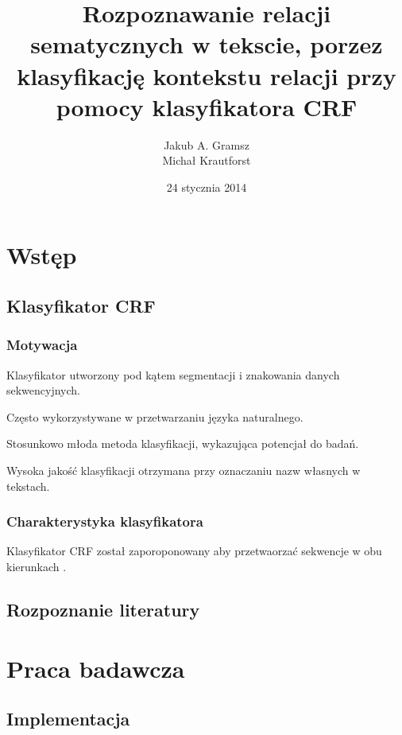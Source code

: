 \documentclass[a4paper,10pt]{report}
\title{Rozpoznawanie relacji sematycznych w tekscie, porzez klasyfikację kontekstu relacji przy pomocy klasyfikatora \textbf{CRF}}
\author{Jakub A. Gramsz \\ Michał Krautforst}
\date{24 stycznia 2014}
\begin{document}
\renewcommand{\figurename}{Wykres}
\renewcommand{\chaptername}{}

\maketitle
\tableofcontents

\chapter{Wstęp} %

\section{Klasyfikator CRF} 

\subsection{Motywacja}

Klasyfikator utworzony pod kątem segmentacji i znakowania danych sekwencyjnych.

Często wykorzystywane w przetwarzaniu języka naturalnego.

Stosunkowo młoda metoda klasyfikacji, wykazująca potencjał do badań.

Wysoka jakość klasyfikacji otrzymana przy oznaczaniu nazw własnych w tekstach.

\subsection{Charakterystyka klasyfikatora}

Klasyfikator CRF został zaporoponowany aby przetwaorzać sekwencje w obu kierunkach \cite{lafferty2001crf}.

\section{Rozpoznanie literatury}



\chapter{Praca badawcza}

\section{Implementacja}
\end{document}
